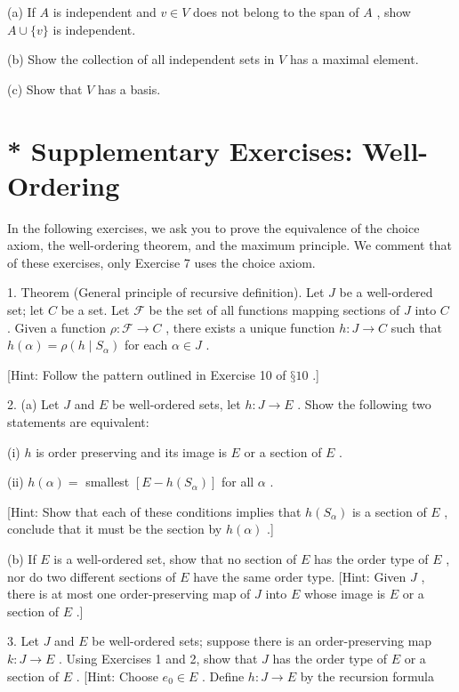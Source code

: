 (a) If \(A\) is independent and \(v \in  V\) does not belong to the span of \(A\) , show \(A \cup  \{ v\}\) is independent.

(b) Show the collection of all independent sets in \(V\) has a maximal element.

(c) Show that \(V\) has a basis.

\section*{* Supplementary Exercises: Well-Ordering}

In the following exercises, we ask you to prove the equivalence of the choice axiom, the well-ordering theorem, and the maximum principle. We comment that of these exercises, only Exercise 7 uses the choice axiom.

1. Theorem (General principle of recursive definition). Let \(J\) be a well-ordered set; let \(C\) be a set. Let \(\mathcal{F}\) be the set of all functions mapping sections of \(J\) into \(C\) . Given a function \(\rho  : \mathcal{F} \rightarrow  C\) , there exists a unique function \(h : J \rightarrow  C\) such that \(h\left( \alpha \right)  = \rho \left( {h \mid  {S}_{\alpha }}\right)\) for each \(\alpha  \in  J\) .

[Hint: Follow the pattern outlined in Exercise 10 of \(§{10}\) .]

2. (a) Let \(J\) and \(E\) be well-ordered sets, let \(h : J \rightarrow  E\) . Show the following two statements are equivalent:

(i) \(h\) is order preserving and its image is \(E\) or a section of \(E\) .

(ii) \(h\left( \alpha \right)  =\) smallest \(\left\lbrack  {E - h\left( {S}_{\alpha }\right) }\right\rbrack\) for all \(\alpha\) .

[Hint: Show that each of these conditions implies that \(h\left( {S}_{\alpha }\right)\) is a section of \(E\) , conclude that it must be the section by \(h\left( \alpha \right)\) .]

(b) If \(E\) is a well-ordered set, show that no section of \(E\) has the order type of \(E\) , nor do two different sections of \(E\) have the same order type. [Hint: Given \(J\) , there is at most one order-preserving map of \(J\) into \(E\) whose image is \(E\) or a section of \(E\) .]

3. Let \(J\) and \(E\) be well-ordered sets; suppose there is an order-preserving map \(k : J \rightarrow  E\) . Using Exercises 1 and 2, show that \(J\) has the order type of \(E\) or a section of \(E\) . [Hint: Choose \({e}_{0} \in  E\) . Define \(h : J \rightarrow  E\) by the recursion formula

